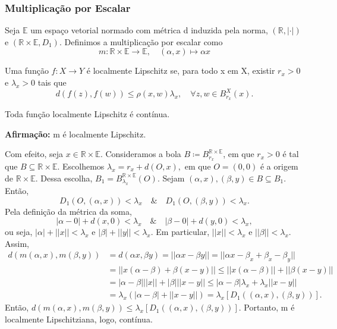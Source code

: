 \documentclass[metric_notes.tex]{subfiles}
\begin{document}
\subsubsection{Multiplicação por Escalar}
Seja \(\mathbb{E}\) um espaço vetorial normado com métrica d induzida pela norma, \((\mathbb{R}, |\cdot |)\) e \((\mathbb{R}\times \mathbb{E}, D_{1})\).
Definimos a multiplicação por escalar como
\[
	m:\mathbb{R}\times \mathbb{E}\rightarrow \mathbb{E},\quad (\alpha ,x)\mapsto \alpha x
\]
\begin{def*}
	Uma função \(f:X\rightarrow Y\) é localmente Lipschitz se, para todo x em X, existir \(r_{x}>0\) e \(\lambda_{x}>0\) tais que
	\[
		d(f(z), f(w))\leq \rho (x, w)\lambda_{x},\quad \forall z, w\in B_{r_{x}}^{X}(x).
	\]
\end{def*}
Toda função localmente Lipschitz é contínua.

\textbf{Afirmação:} m é localmente Lipschitz.

Com efeito, seja \(x\in \mathbb{R}\times \mathbb{E}\). Consideramos a bola \(B\coloneqq B_{r_{x}}^{\mathbb{R}\times \mathbb{E}}\), em que \(r_{x}>0\)
é tal que \(B\subseteq{\mathbb{R}\times \mathbb{E}}.\) Escolhemos \(\lambda_{x} = r_{x}+d(O, x),\) em que \(O = (0, 0)\) é a origem
de \(\mathbb{R}\times \mathbb{E}.\) Dessa escolha, \(B_{1}=B_{\lambda_{x}}^{\mathbb{R}\times \mathbb{E}}(O)\). Sejam \((\alpha , x), (\beta, y)\in B\subseteq{B_{1}}.\)
Então,
\[
	D_{1}(O, (\alpha , x)) < \lambda_{x}\quad\&\quad D_{1}(O, (\beta, y)) < \lambda_{x}.
\]
Pela definição da métrica da soma,
\[
	|\alpha - 0| + d(x, 0) < \lambda_{x}\quad\&\quad |\beta - 0| + d(y, 0) < \lambda_{x},
\]
ou seja, \(|\alpha | + ||x|| < \lambda_{x}\) e \(|\beta |+||y||<\lambda_{x}\). Em particular, \(||x|| < \lambda_{x}\) e \(||\beta || < \lambda_{x}\). Assim,
\begin{align*}
	d(m(\alpha, x), m(\beta, y)) & = d(\alpha x, \beta y) = ||\alpha x - \beta y|| = ||\alpha x-\beta _{x}+\beta _{x}-\beta _{y}|| \\
	                             & =||x(\alpha -\beta ) + \beta (x-y)||\leq ||x(\alpha -\beta )|| + ||\beta (x-y)||                \\
	                             & =|\alpha -\beta |||x||+|\beta |||x-y||\leq |\alpha -\beta |\lambda_{x} + \lambda_{x}||x-y||     \\
	                             & =\lambda_{x}(|\alpha -\beta | + ||x-y||) = \lambda_{x}[D_{1}((\alpha , x), (\beta , y))].
\end{align*}
Então, \(d(m(\alpha , x), m(\beta , y))\leq \lambda_{x}[D_{1}((\alpha, x), (\beta , y))] \). Portanto, m é localmente Lipschitziana, logo, contínua.
\end{document}
